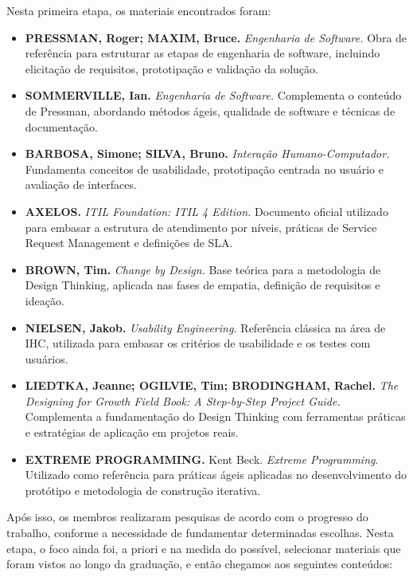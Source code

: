 Nesta primeira etapa, os materiais encontrados foram:
\begin{itemize}
    \item \textbf{PRESSMAN, Roger; MAXIM, Bruce.} \textit{Engenharia de Software.} Obra de referência para estruturar as etapas de engenharia de software, incluindo elicitação de requisitos, prototipação e validação da solução.

    \item \textbf{SOMMERVILLE, Ian.} \textit{Engenharia de Software.} Complementa o conteúdo de Pressman, abordando métodos ágeis, qualidade de software e técnicas de documentação.

    \item \textbf{BARBOSA, Simone; SILVA, Bruno.} \textit{Interação Humano-Computador.} Fundamenta conceitos de usabilidade, prototipação centrada no usuário e avaliação de interfaces.

    \item \textbf{AXELOS.} \textit{ITIL Foundation: ITIL 4 Edition.} Documento oficial utilizado para embasar a estrutura de atendimento por níveis, práticas de Service Request Management e definições de SLA.

    \item \textbf{BROWN, Tim.} \textit{Change by Design.} Base teórica para a metodologia de Design Thinking, aplicada nas fases de empatia, definição de requisitos e ideação.

    \item \textbf{NIELSEN, Jakob.} \textit{Usability Engineering.} Referência clássica na área de IHC, utilizada para embasar os critérios de usabilidade e os testes com usuários.

    \item \textbf{LIEDTKA, Jeanne; OGILVIE, Tim; BRODINGHAM, Rachel.} \textit{The Designing for Growth Field Book: A Step-by-Step Project Guide.} Complementa a fundamentação do Design Thinking com ferramentas práticas e estratégias de aplicação em projetos reais.

    \item \textbf{EXTREME PROGRAMMING.} Kent Beck. \textit{Extreme Programming}. Utilizado como referência para práticas ágeis aplicadas no desenvolvimento do protótipo e metodologia de construção iterativa.
\end{itemize}

Após isso, os membros realizaram pesquisas de acordo com o progresso do trabalho, conforme a necessidade de fundamentar determinadas escolhas. Nesta etapa, o foco ainda foi, a priori e na medida do possível, selecionar materiais que foram vistos ao longo da graduação, e então chegamos aos seguintes conteúdos:

